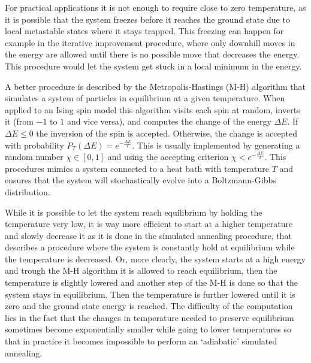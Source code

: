 For practical applications it is not enough to require close to zero temperature, as it is possible that the system freezes  before it reaches the ground state due to local metastable states where it stays trapped.
This freezing can happen for example in the iterative improvement procedure, where only downhill moves in the energy are allowed until there is no possible move that decreases the energy. This procedure would let the system get stuck in a local minimum in the energy.

A better procedure is described by the Metropolis-Hastings (M-H) algorithm \cite{Metropolis} that simulates a system of particles in equilibrium at a given temperature.
When applied to an Ising spin model this algorithm visits each spin at random, inverts it (from $-1$ to $1$ and vice versa), and computes the change of the energy $\Delta E$. If $\Delta E \leq 0$ the inversion of the spin is accepted.
Otherwise, the change is accepted with probability $P_T(\Delta E) = e^{-\frac{\Delta E}{T}}$. This is usually implemented by generating a random number $\chi \in \left[ 0 , 1 \right]$ and using the accepting criterion $\chi < e^{-\frac{\Delta E}{T}}$.
This procedures mimics a system connected to a heat bath with temperature $T$ and ensures that the system will stochastically evolve into a Boltzmann-Gibbs distribution.

While it is possible to let the system reach equilibrium by holding the temperature very low, it is way more efficient to start at a higher temperature and slowly decrease it as it is done in the simulated annealing procedure, that describes a procedure where the system is constantly hold at equilibrium while the temperature is decreased.
Or, more clearly, the system starts at a high energy and trough the M-H algorithm it is allowed to reach equilibrium, then the temperature is slightly lowered and another step of the M-H is done so that the system stays in equilibrium.
Then the temperature is further lowered until it is zero and the ground state energy is reached.
The difficulty of the computation lies in the fact that the changes in temperature needed to preserve equilibrium sometimes become exponentially smaller while going to lower temperatures so that in practice it becomes impossible to perform an `adiabatic' simulated annealing.

